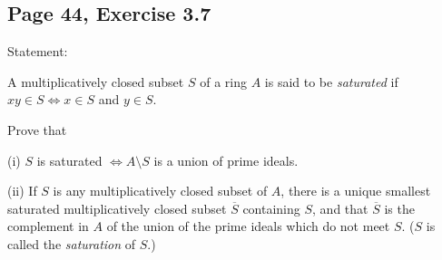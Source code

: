 \documentclass[parskip=half,fontsize=12pt]{scrartcl}%
\newcommand{\mf}{\mathfrak}
\newcommand{\ppp}{\mf p}
\newcommand{\qqq}{\mf q}
\begin{document}
%
\begin{comment}
\subsection{Page 44, Exercise 3.6}%

We leave to the reader the proof of the fact that $\Sigma$ has maximal elements. Note that 

$(\star)$ $S\in\Sigma\implies A\setminus S$ contains a prime ideal of $A$.

Let $\ppp$ be a minimal prime ideal of $A$. Then $S:=A\setminus\ppp$ is in $\Sigma$. Let $T$ be an element of $\Sigma$ which contains $S$. By $(\star)$ there is a prime ideal $\qqq$ contained in $A\setminus T\subset A\setminus S=\ppp$. This implies $\qqq=\ppp$, and thus $T=S$. This shows that $S$ is a maximal element of $\Sigma$. 

Let $S$ be a maximal element of $\Sigma$. By $(\star)$ there is a prime ideal $\ppp$ of $A$ contained in $A\setminus S$. As $A\setminus\ppp$ is in $\Sigma$ we have $S=A\setminus\ppp$, and $\ppp$ is clearly prime.
\end{comment}
%


\subsection{Page 44, Exercise 3.7}%

Statement:

A multiplicatively closed subset $S$ of a ring $A$ is said to be \emph{saturated} if $xy\in S\iff x\in S$ and $y\in S$. %

Prove that

(i) $S$ is saturated $\iff A\setminus S$ %
is a union of prime ideals.

(ii) If $S$ is any multiplicatively closed subset of $A$, there is a unique smallest saturated multiplicatively closed subset $\overline S$ containing $S$, and that $\overline S$ is the complement in $A$ of the union of the prime ideals which do not meet $S$. ($S$ is called the \emph{saturation} of $S$.)
\end{document}
